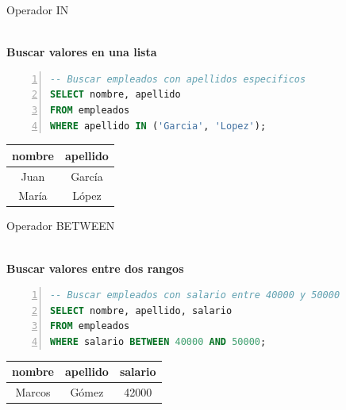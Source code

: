 \documentclass{beamer}
\begin{document}
\begin{frame}[fragile]{Operador IN}
    \begin{center}
        {\Large \faList}\\[0.2cm]
        \textbf{Buscar valores en una lista}
    \end{center}
    
    \vspace{0.3cm}
    
    \begin{lstlisting}[language=SQL, numbers=left, numbersep=5pt]
-- Buscar empleados con apellidos especificos
SELECT nombre, apellido
FROM empleados
WHERE apellido IN ('Garcia', 'Lopez');
    \end{lstlisting}
    
    \vspace{0.3cm}
    
    \begin{center}
        \begin{tabular}{cc}
            \toprule
            nombre & apellido \\
            \midrule
            Juan & García \\
            María & López \\
            \bottomrule
        \end{tabular}
    \end{center}
\end{frame}

\begin{frame}[fragile]{Operador BETWEEN}
    \begin{center}
        {\Large \faArrowsH}\\[0.2cm]
        \textbf{Buscar valores entre dos rangos}
    \end{center}
    
    \vspace{0.3cm}
    
    \begin{lstlisting}[language=SQL, numbers=left, numbersep=5pt]
-- Buscar empleados con salario entre 40000 y 50000
SELECT nombre, apellido, salario
FROM empleados
WHERE salario BETWEEN 40000 AND 50000;
    \end{lstlisting}
    
    \vspace{0.3cm}
    
    \begin{center}
        \begin{tabular}{ccc}
            \toprule
            nombre & apellido & salario \\
            \midrule
            Marcos & Gómez & 42000 \\
            \bottomrule
        \end{tabular}
    \end{center}
\end{frame}
\end{document}
